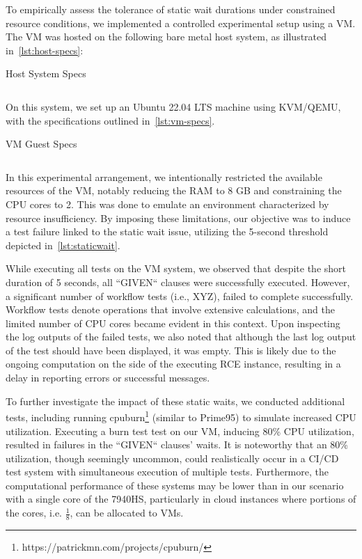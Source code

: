 To empirically assess the tolerance of static wait durations under constrained resource conditions, we implemented a controlled experimental setup using a \ac{VM}. The \ac{VM} was hosted on the following bare metal host system, as illustrated in~\cref{lst:host-specs}:

\begin{listing}
\caption{Host System Specs}
\label{lst:host-specs}
\inputminted{text}{files/neofetch-host.txt}
\end{listing}

On this system, we set up an Ubuntu 22.04 LTS machine using KVM/QEMU, with the specifications outlined in~\cref{lst:vm-specs}.
\begin{listing}
\caption{\acl{VM} Guest Specs}
\label{lst:vm-specs}
\inputminted{text}{files/neofetch-test-host.txt}
\end{listing}

In this experimental arrangement, we intentionally restricted the available resources of the \ac{VM}, notably reducing the RAM to 8 GB and constraining the CPU cores to 2. This was done to emulate an environment characterized by resource insufficiency. By imposing these limitations, our objective was to induce a test failure linked to the static wait issue, utilizing the 5-second threshold depicted in~\cref{lst:staticwait}. 

While executing all tests on the \ac{VM} system, we observed that despite the short duration of 5 seconds, all ``GIVEN`` clauses were successfully executed. However, a significant number of workflow tests (i.e., XYZ), failed to complete successfully. Workflow tests denote operations that involve extensive calculations, and the limited number of CPU cores became evident in this context. Upon inspecting the log outputs of the failed tests, we also noted that although the last log output of the test should have been displayed, it was empty. This is likely due to the ongoing computation on the side of the executing \ac{RCE} instance, resulting in a delay in reporting errors or successful messages.

To further investigate the impact of these static waits, we conducted additional tests, including running cpuburn\footnote{https://patrickmn.com/projects/cpuburn/} (similar to Prime95) to simulate increased CPU utilization. Executing a burn test test on our VM, inducing 80\% CPU utilization, resulted in failures in the ``GIVEN`` clauses' waits. It is noteworthy that an 80\% utilization, though seemingly uncommon, could realistically occur in a CI/CD test system with simultaneous execution of multiple tests. Furthermore, the computational performance of these systems may be lower than in our scenario with a single core of the 7940HS, particularly in cloud instances where portions of the cores, i.e. $\frac{1}{8}$, can be allocated to \acp{VM}.


